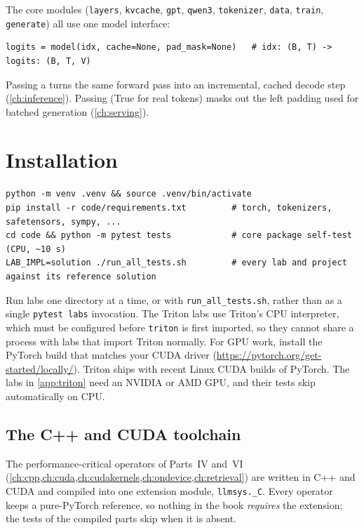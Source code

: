 The core modules (\texttt{layers}, \texttt{kvcache}, \texttt{gpt}, \texttt{qwen3},
\texttt{tokenizer}, \texttt{data}, \texttt{train}, \texttt{generate}) all use one model
interface:
\begin{lstlisting}
logits = model(idx, cache=None, pad_mask=None)   # idx: (B, T) -> logits: (B, T, V)
\end{lstlisting}
Passing a  turns the same forward pass into an incremental, cached decode step
(\cref{ch:inference}). Passing  (True for real tokens) masks out the
left padding used for batched generation (\cref{ch:serving}).

\section{Installation}

\begin{lstlisting}[style=shell]
python -m venv .venv && source .venv/bin/activate
pip install -r code/requirements.txt         # torch, tokenizers, safetensors, sympy, ...
cd code && python -m pytest tests            # core package self-test (CPU, ~10 s)
LAB_IMPL=solution ./run_all_tests.sh         # every lab and project against its reference solution
\end{lstlisting}
Run labs one directory at a time, or with \texttt{run\_all\_tests.sh}, rather than as a single
\texttt{pytest labs} invocation. The Triton labs use Triton's CPU interpreter, which must be
configured before \texttt{triton} is first imported, so they cannot share a process with labs that
import Triton normally.
For GPU work, install the PyTorch build that matches your CUDA driver
(\url{https://pytorch.org/get-started/locally/}). Triton ships with recent Linux CUDA builds of
PyTorch. The labs in \cref{app:triton} need an NVIDIA or AMD GPU, and their tests skip
automatically on CPU.

\subsection{The C++ and CUDA toolchain}\label{sec:setup:toolchain}

The performance-critical operators of Parts~IV and~VI
(\cref{ch:cpp,ch:cuda,ch:cudakernels,ch:ondevice,ch:retrieval}) are written in C++ and CUDA and
compiled into one extension module, \texttt{llmsys.\_C}. Every operator keeps a pure-PyTorch
reference, so nothing in the book \emph{requires} the extension; the tests of the compiled parts skip
when it is absent.

